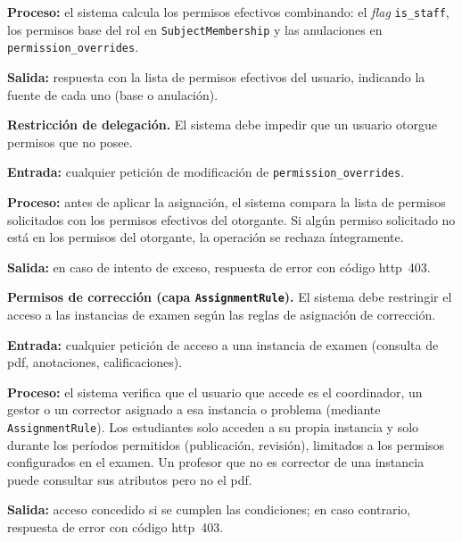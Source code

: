 \begin{functional}
    \textbf{Proceso:} el sistema calcula los permisos efectivos combinando: el \textit{flag}
    \texttt{is\_staff}, los permisos base del rol en \texttt{SubjectMembership} y las
    anulaciones en \texttt{permission\_overrides}.

    \textbf{Salida:} respuesta con la lista de permisos efectivos del usuario, indicando la
    fuente de cada uno (base o anulación).

    \item \textbf{Restricción de delegación.} \label{rf:perms:delegation}
    El sistema debe impedir que un usuario otorgue permisos que no posee.

    \textbf{Entrada:} cualquier petición de modificación de \texttt{permission\_overrides}.

    \textbf{Proceso:} antes de aplicar la asignación, el sistema compara la lista de
    permisos solicitados con los permisos efectivos del otorgante. Si algún permiso
    solicitado no está en los permisos del otorgante, la operación se rechaza íntegramente.

    \textbf{Salida:} en caso de intento de exceso, respuesta de error con código
    \acs{http}~403.

    \item \textbf{Permisos de corrección (capa \texttt{AssignmentRule}).}
    \label{rf:perms:correction}
    El sistema debe restringir el acceso a las instancias de examen según las reglas de
    asignación de corrección.

    \textbf{Entrada:} cualquier petición de acceso a una instancia de examen (consulta de
    \acs{pdf}, anotaciones, calificaciones).

    \textbf{Proceso:} el sistema verifica que el usuario que accede es el coordinador, un
    gestor o un corrector asignado a esa instancia o problema (mediante
    \texttt{AssignmentRule}). Los estudiantes solo acceden a su propia instancia y solo
    durante los períodos permitidos (publicación, revisión), limitados a los permisos
    configurados en el examen. Un profesor que no es corrector de una instancia puede
    consultar sus atributos pero no el \acs{pdf}.

    \textbf{Salida:} acceso concedido si se cumplen las condiciones; en caso contrario,
    respuesta de error con código \acs{http}~403.

\end{functional}
